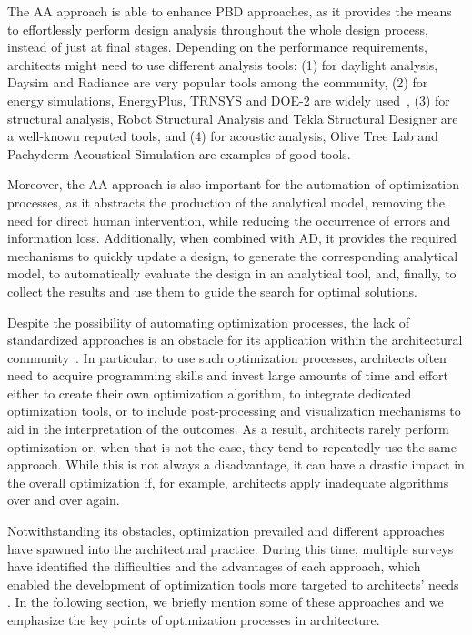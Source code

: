 The \ac{AA} approach is able to enhance \ac{PBD} approaches, as it provides the means to effortlessly perform design analysis throughout the whole design process, instead of just at final stages. Depending on the performance requirements, architects might need to use different analysis tools: (1) for daylight analysis, Daysim and Radiance are very popular tools among the community, (2) for energy simulations, EnergyPlus, TRNSYS and DOE-2 are widely used~\cite{Nguyen2014}, (3) for structural analysis, Robot Structural Analysis and Tekla Structural Designer are a well-known reputed tools, and (4) for acoustic analysis, Olive Tree Lab and Pachyderm Acoustical Simulation are examples of good tools.%

Moreover, the \ac{AA} approach is also important for the automation of optimization processes, as it abstracts the production of the analytical model, removing the need for direct human intervention, while reducing the occurrence of errors and information loss. Additionally, when combined with \ac{AD}, it provides the required mechanisms to quickly update a design, to generate the corresponding analytical model, to automatically evaluate the design in an analytical tool, and, finally, to collect the results and use them to guide the search for optimal solutions. 

Despite the possibility of automating optimization processes, the lack of standardized approaches is an obstacle for its application within the architectural community~\cite{Attia2013}. In particular, to use such optimization processes, architects often need to acquire programming skills and invest large amounts of time and effort either to create their own optimization algorithm, to integrate dedicated optimization tools, or to include post-processing and visualization mechanisms to aid in the interpretation of the outcomes. As a result, architects rarely perform optimization or, when that is not the case, they tend to repeatedly use the same approach. While this is not always a disadvantage, it can have a drastic impact in the overall optimization if, for example, architects apply inadequate algorithms over and over again.

Notwithstanding its obstacles, optimization prevailed and different approaches have spawned into the architectural practice. During this time, multiple surveys have identified the difficulties and the advantages of each approach, which enabled the development of optimization tools more targeted to architects' needs \cite{Attia2013,Nguyen2014,Shi2016}. In the following section, we briefly mention some of these approaches and we emphasize the key points of optimization processes in architecture.
	
